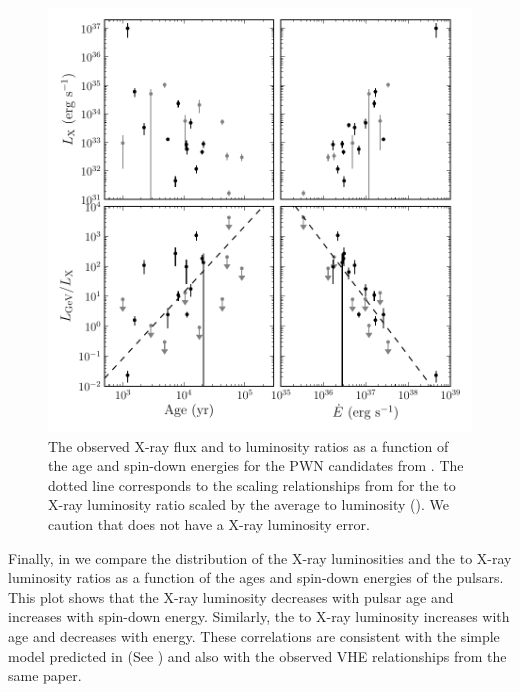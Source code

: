 \begin{figure}[htbp]
  \centering
  \includegraphics{chapters/population_study/figures/pwn_age_edot_vs_l_xray.pdf}
  \caption{The observed X-ray flux and \gev to \tev luminosity ratios
  as a function of the age and spin-down energies for the \ac{PWN}
  candidates from .
  The dotted line corresponds to the scaling relationships from
  \cite{mattana_2009_evolution-gamma-} for the \tev to X-ray
  luminosity ratio scaled by the average \gev to \tev luminosity
  (\MeanLuminosityRatio).  We caution that \threecfiftyeight does not
  have a X-ray luminosity error.}
\end{figure}

Finally, in  we compare the distribution
of the X-ray luminosities and the \gev to X-ray luminosity ratios as a
function of the ages and spin-down energies of the pulsars.  This plot
shows that the X-ray luminosity decreases with pulsar age and increases
with spin-down energy. Similarly, the \gev to X-ray luminosity increases
with age and decreases with energy.  These correlations are consistent
with the simple model predicted in \cite{mattana_2009_evolution-gamma-}
(See ) and also with the observed \ac{VHE}
relationships from the same paper.
